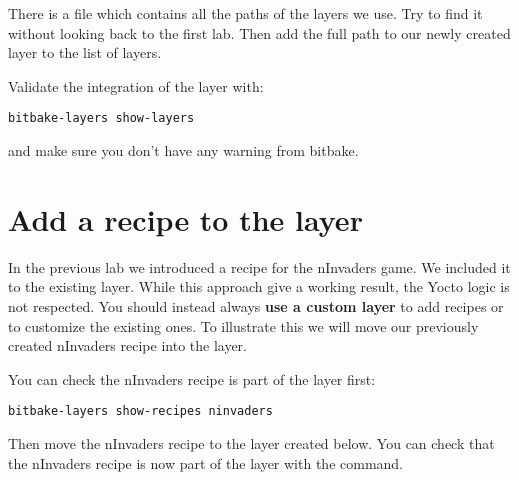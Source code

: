 There is a file which contains all the paths of the layers we use. Try to find it
without looking back to the first lab. Then add the full path to our newly
created layer to the list of layers.

Validate the integration of the  layer with:
\begin{verbatim}
bitbake-layers show-layers
\end{verbatim}

and make sure you don't have any warning from bitbake.

\section{Add a recipe to the layer}

In the previous lab we introduced a recipe for the nInvaders game. We included
it to the existing  layer. While this approach give a working result,
the Yocto logic is not respected. You should instead always \textbf{use a custom layer}
to add recipes or to customize the existing ones. To illustrate this we will
move our previously created nInvaders recipe into the  layer.

You can check the nInvaders recipe is part of the  layer first:
\begin{verbatim}
bitbake-layers show-recipes ninvaders
\end{verbatim}

Then move the nInvaders recipe to the layer created below. You can check that
the nInvaders recipe is now part of the  layer with the
 command.
